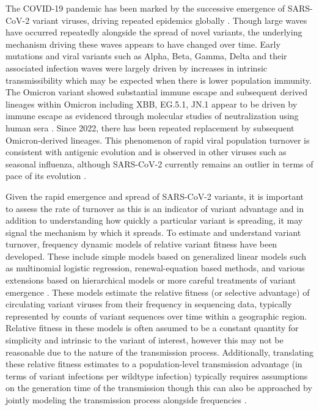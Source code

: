 \documentclass[12pt,oneside,letterpaper]{article}
\begin{document}
The COVID-19 pandemic has been marked by the successive emergence of SARS-CoV-2 variant viruses, driving repeated epidemics globally \cite{tegally2021detection, Volz2021}.
Though large waves have occurred repeatedly alongside the spread of novel variants, the underlying mechanism driving these waves appears to have changed over time.
Early mutations and viral variants such as Alpha, Beta, Gamma, Delta and their associated infection waves were largely driven by increases in intrinsic transmissibility which may be expected when there is lower population immunity.
The Omicron variant showed substantial immune escape and subsequent derived lineages within Omicron including XBB, EG.5.1, JN.1 appear to be driven by immune escape as evidenced through molecular studies of neutralization using human sera \cite{Cao2021, Cao2022, Bekliz2024, Jian2023}.
Since 2022, there has been repeated replacement by subsequent Omicron-derived lineages.
This phenomenon of rapid viral population turnover is consistent with antigenic evolution and is observed in  other viruses such as seasonal influenza, although SARS-CoV-2 currently remains an outlier in terms of pace of its evolution \cite{Koel2013, Bedford2014, kistler2023atlas}.

Given the rapid emergence and spread of SARS-CoV-2 variants, it is important to assess the rate of turnover as this is an indicator of variant advantage and in addition to understanding how quickly a particular variant is spreading, it may signal the mechanism by which it spreads.
To estimate and understand variant turnover, frequency dynamic models of relative variant fitness have been developed.
These include simple models based on generalized linear models such as multinomial logistic regression, renewal-equation based methods, and various extensions based on hierarchical models or more careful treatments of variant emergence \cite{susswein2023leveraging, figgins2022sars, Piantham2022, Annavajhala2021, Lefrancq2023}.
These models estimate the relative fitness (or selective advantage) of circulating variant viruses from their frequency in sequencing data, typically represented by counts of variant sequences over time within a geographic region.
Relative fitness in these models is often assumed to be a constant quantity for simplicity and intrinsic to the variant of interest, however this may not be reasonable due to the nature of the transmission process.
Additionally, translating these relative fitness estimates to a population-level transmission advantage (in terms of variant infections per wildtype infection) typically requires assumptions on the generation time of the transmission though this can also be approached by jointly modeling the transmission process alongside frequencies \cite{Wallinga2006, figgins2022sars}.
\end{document}

